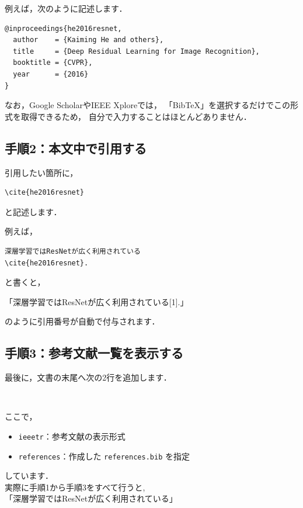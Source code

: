 \documentclass[a4paper,twocolumn]{jsarticle}
\begin{document}
例えば，次のように記述します．

\begin{verbatim}
@inproceedings{he2016resnet,
  author    = {Kaiming He and others},
  title     = {Deep Residual Learning for Image Recognition},
  booktitle = {CVPR},
  year      = {2016}
}
\end{verbatim}

なお，Google ScholarやIEEE Xploreでは，
「BibTeX」を選択するだけでこの形式を取得できるため，
自分で入力することはほとんどありません．

\subsection*{手順2：本文中で引用する}

引用したい箇所に，

\begin{verbatim}
\cite{he2016resnet}
\end{verbatim}

と記述します．

例えば，

\begin{verbatim}
深層学習ではResNetが広く利用されている
\cite{he2016resnet}.
\end{verbatim}

と書くと，

「深層学習ではResNetが広く利用されている[1].」

のように引用番号が自動で付与されます．

\subsection*{手順3：参考文献一覧を表示する}

最後に，文書の末尾へ次の2行を追加します．

\begin{verbatim}


\end{verbatim}

ここで，

\begin{itemize}
    \item \texttt{ieeetr}：参考文献の表示形式
    \item \texttt{references}：作成した \texttt{references.bib} を指定
\end{itemize}

しています．\\
実際に手順1から手順3をすべて行うと,\\
「深層学習ではResNetが広く利用されている\cite{he2016resnet}」


\end{document}

